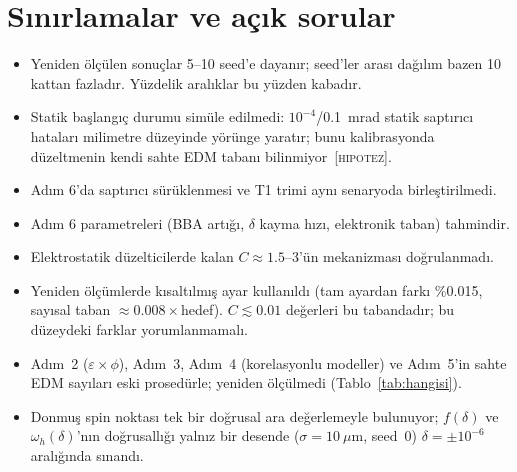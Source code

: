 \documentclass[11pt,a4paper]{article}
\newcommand{\HIP}{\textsc{[hipotez]}}
\begin{document}
\section{Sınırlamalar ve açık sorular}
\begin{itemize}
\item Yeniden ölçülen sonuçlar 5--10 seed'e dayanır; seed'ler arası dağılım bazen 10 kattan fazladır.
Yüzdelik aralıklar bu yüzden kabadır.
\item Statik başlangıç durumu simüle edilmedi: $10^{-4}$/0.1~mrad statik saptırıcı hataları milimetre
düzeyinde yörünge yaratır; bunu kalibrasyonda düzeltmenin kendi sahte EDM tabanı bilinmiyor~\HIP.
\item Adım 6'da saptırıcı sürüklenmesi ve T1 trimi aynı senaryoda birleştirilmedi.
\item Adım 6 parametreleri (BBA artığı, $\delta$ kayma hızı, elektronik taban) tahmindir.
\item Elektrostatik düzelticilerde kalan $C\approx1.5$--3'ün mekanizması doğrulanmadı.
\item Yeniden ölçümlerde kısaltılmış ayar kullanıldı (tam ayardan farkı \%0.015, sayısal taban
$\approx0.008\times$hedef). $C\lesssim0.01$ değerleri bu tabandadır; bu düzeydeki farklar yorumlanmamalı.
\item Adım~2 ($\varepsilon\times\phi$), Adım~3, Adım~4 (korelasyonlu modeller) ve Adım~5'in sahte EDM
sayıları eski prosedürle; yeniden ölçülmedi (Tablo~\ref{tab:hangisi}).
\item Donmuş spin noktası tek bir doğrusal ara değerlemeyle bulunuyor; $f(\delta)$ ve $\omega_h(\delta)$'nın
doğrusallığı yalnız bir desende ($\sigma=10~\mu$m, seed~0) $\delta=\pm10^{-6}$ aralığında sınandı.
\end{itemize}

\end{document}
